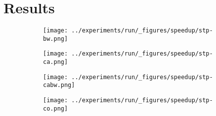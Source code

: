 
\chapter{Results}
\label{cpt:results}

\begin{figure}[ht]
        \centering
        \begin{subfigure}[b]{0.5\textwidth}
                \texttt{[image: ../experiments/run/\_figures/speedup/stp-bw.png]}
                \label{fig:processor_model:sensitivity:ol}
        \end{subfigure}%
        \begin{subfigure}[b]{0.5\textwidth}
                \texttt{[image: ../experiments/run/\_figures/speedup/stp-ca.png]}
                \label{fig:processor_model:sensitivity:os}
        \end{subfigure}        
        \begin{subfigure}[b]{0.5\textwidth}
                \texttt{[image: ../experiments/run/\_figures/speedup/stp-cabw.png]}
                \label{fig:processor_model:sensitivity:ol}
        \end{subfigure}%
        \begin{subfigure}[b]{0.5\textwidth}
                \texttt{[image: ../experiments/run/\_figures/speedup/stp-co.png]}
                \label{fig:processor_model:sensitivity:os}
        \end{subfigure}
\end{figure}